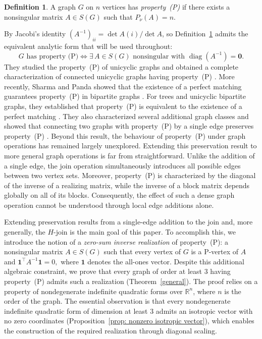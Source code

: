 \documentclass[12pt,reqno]{amsart}
\theoremstyle{definition}
\newtheorem{defn}[thm]{Definition}
\numberwithin{equation}{subsection}
\numberwithin{equation}{section}
\newcommand{\thmref}[1]{Theorem~\ref{#1}}
\newcommand{\propref}[1]{Proposition~\ref{#1}}
\def\det{\operatorname{det}}
\begin{document}
\begin{defn}\label{def:P}
A graph \(G\) on \(n\) vertices has \emph{property~(P)} if there exists a nonsingular matrix
\(A\in S(G)\) such that
\(
P_{\nu}(A)=n.
\)
\end{defn}
By Jacobi's identity
$(A^{-1})_{ii}=\det A(i)/\det A$, so
Definition~\ref{def:P} admits the equivalent analytic form that will be used
throughout:
\begin{equation*}\label{eq:hollow}
   G \text{ has property (P)} \iff \exists\, A\in S(G) \text{ nonsingular
   with } \operatorname{diag}(A^{-1})=\mathbf{0}.
\end{equation*}
They studied the property~(P) of unicyclic graphs and obtained a complete characterization of connected unicyclic graphs having property~(P) \cite[Theorem~6.1]{Howlader}.
More recently, Sharma and Panda showed that the existence of a perfect matching guarantees property~(P) in bipartite graphs \cite[Theorem~3.1]{sharma}. For trees and unicyclic bipartite graphs, they established that property~(P) is equivalent to the existence of a perfect matching \cite[Theorems~3.3 and~3.8]{sharma}. They also characterized several additional graph classes and showed that connecting two graphs with property~(P) by a single edge preserves property~(P) \cite[Theorem~5.3]{sharma}. Beyond this result, the behaviour of property~(P) under graph operations has remained largely unexplored. 
Extending this preservation result to more general graph operations is far from straightforward. Unlike the addition of a single edge, the join operation simultaneously introduces all possible edges between two vertex sets. Moreover, property~(P) is characterized by the diagonal of the inverse of a realizing matrix, while the inverse of a block matrix depends globally on all of its blocks. Consequently, the effect of such a dense graph operation cannot be understood through local edge
additions alone.

Extending preservation results from a single-edge addition to the join
and, more generally, the \(H\)-join is the main goal of this paper. 
To accomplish this, we introduce the notion of a \emph{zero-sum inverse realization} of property~(P): a nonsingular matrix \(A\in S(G)\) such that every vertex of \(G\) is a P-vertex of \(A\) and
\(
\mathbf{1}^{\top}A^{-1}\mathbf{1}=0,
\)
where \(\mathbf{1}\) denotes the all-ones vector.
Despite this additional algebraic constraint, we prove that every graph of order at least $3$ having property~(P) admits such a realization (\thmref{general}). The proof relies on a property of nondegenerate indefinite quadratic forms over $\mathbb{R}^n$, where $n$ is the order of the graph.  The essential observation is that every nondegenerate indefinite quadratic form of dimension at least $3$ admits an isotropic vector with no zero coordinates (\propref{prop: nonzero isotropic vector}), which enables the construction of the required realization through diagonal scaling. 
\end{document}
